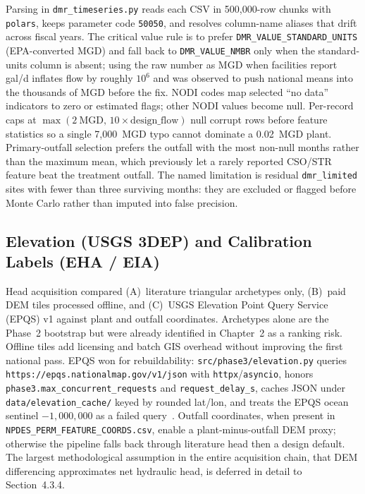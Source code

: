 \documentclass[12pt,letterpaper]{report}
\begin{document}
Parsing in \texttt{dmr\_timeseries.py} reads each CSV in 500{,}000-row chunks with
\texttt{polars}, keeps parameter code \texttt{50050}, and resolves column-name
aliases that drift across fiscal years. The critical value rule is to prefer
\texttt{DMR\_VALUE\_STANDARD\_UNITS} (EPA-converted MGD) and fall back to
\texttt{DMR\_VALUE\_NMBR} only when the standard-units column is absent; using the
raw number as MGD when facilities report gal/d inflates flow by roughly
$10^{6}$ and was observed to push national means into the thousands of MGD before
the fix. NODI codes map selected ``no data'' indicators to zero or estimated
flags; other NODI values become null. Per-record caps at
$\max(2~\mathrm{MGD},\,10\times\mathrm{design\_flow})$ null corrupt rows before
feature statistics so a single 7{,}000~MGD typo cannot dominate a 0.02~MGD plant.
Primary-outfall selection prefers the outfall with the most non-null months rather
than the maximum mean, which previously let a rarely reported CSO/STR feature beat
the treatment outfall. The named limitation is residual \texttt{dmr\_limited}
sites with fewer than three surviving months: they are excluded or flagged before
Monte Carlo rather than imputed into false precision.

\subsection{Elevation (USGS 3DEP) and Calibration Labels (EHA / EIA)}

Head acquisition compared (A)~literature triangular archetypes only, (B)~paid DEM
tiles processed offline, and (C)~USGS Elevation Point Query Service (EPQS) v1
against plant and outfall coordinates. Archetypes alone are the Phase~2 bootstrap
but were already identified in Chapter~2 as a ranking risk. Offline tiles add
licensing and batch GIS overhead without improving the first national pass.
EPQS won for rebuildability: \texttt{src/phase3/elevation.py} queries
\texttt{https://epqs.nationalmap.gov/v1/json} with \texttt{httpx}/\texttt{asyncio},
honors \texttt{phase3.max\_concurrent\_requests} and \texttt{request\_delay\_s},
caches JSON under \texttt{data/elevation\_cache/} keyed by rounded lat/lon, and
treats the EPQS ocean sentinel $-1{,}000{,}000$ as a failed query~\cite{usgs_3dep}.
Outfall coordinates, when present in
\texttt{NPDES\_PERM\_FEATURE\_COORDS.csv}, enable a plant-minus-outfall DEM proxy;
otherwise the pipeline falls back through literature head then a design default.
The largest methodological assumption in the entire acquisition chain, that DEM
differencing approximates net hydraulic head, is deferred in detail to
Section~4.3.4.
\end{document}
